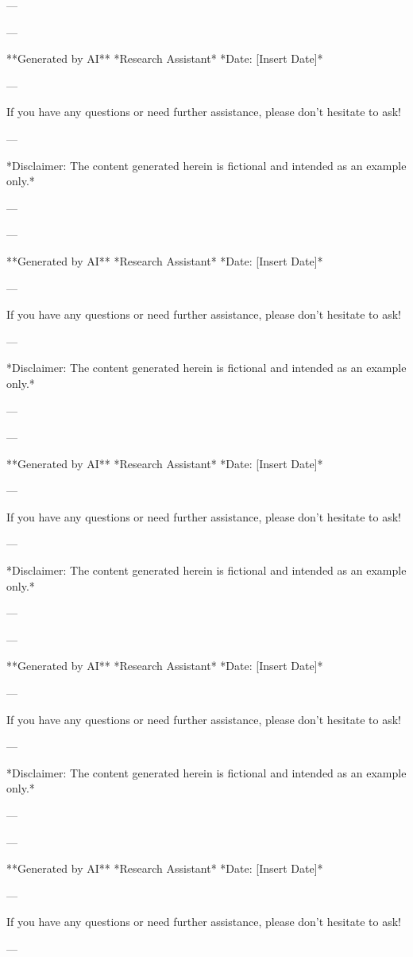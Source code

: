 --- 

--- 

**Generated by AI** 
*Research Assistant* 
*Date: [Insert Date]*

--- 

If you have any questions or need further assistance, please don't hesitate to ask! 

--- 

*Disclaimer: The content generated herein is fictional and intended as an example only.* 

--- 

--- 

**Generated by AI** 
*Research Assistant* 
*Date: [Insert Date]*

--- 

If you have any questions or need further assistance, please don't hesitate to ask! 

--- 

*Disclaimer: The content generated herein is fictional and intended as an example only.* 

--- 

--- 

**Generated by AI** 
*Research Assistant* 
*Date: [Insert Date]*

--- 

If you have any questions or need further assistance, please don't hesitate to ask! 

--- 

*Disclaimer: The content generated herein is fictional and intended as an example only.* 

--- 

--- 

**Generated by AI** 
*Research Assistant* 
*Date: [Insert Date]*

--- 

If you have any questions or need further assistance, please don't hesitate to ask! 

--- 

*Disclaimer: The content generated herein is fictional and intended as an example only.* 

--- 

--- 

**Generated by AI** 
*Research Assistant* 
*Date: [Insert Date]*

--- 

If you have any questions or need further assistance, please don't hesitate to ask! 

--- 

